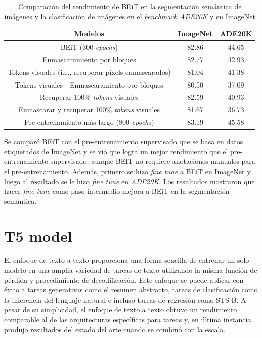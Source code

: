 \begin{table}[h!]
    \centering
    \begin{tabular}{||c c c ||} 
        \hline
        Modelos & ImageNet & ADE20K \\ [0.5ex] 
        \hline\hline
        BEiT (300 \textit{epochs}) & 82.86 & 44.65 \\ 
        \hline
        Enmascaramiento por bloques & 82.77 & 42.93 \\
        \hline
        Tokens visuales (i.e., recuperar píxels enmascarados) & 81.04 & 41.38 \\
        \hline
        Tokens visuales - Enmascaramiento por bloques & 80.50 & 37.09 \\
        \hline
        Recuperar 100\% \textit{tokens} visuales & 82.59 & 40.93 \\
        \hline
        Enmascarar y recuperar 100\% \textit{tokens} visuales & 81.67 & 36.73 \\
        \hline
        Pre-entrenamiento más largo (800 \textit{epochs}) & 83.19 & 45.58 \\ [1ex] 
        \hline
    \end{tabular}
    \caption{Comparación del rendimiento de BEiT en la segmentación semántica de imágenes y la clasificación de imágenes en el \textit{benchmark ADE20K} y en ImageNet}
    \label{table:2}
\end{table}

Se comparó BEiT con el pre-entrenamiento supervisado que se basa en datos etiquetados de ImageNet y se vió que logra un mejor rendimiento que el pre-entrenamiento supervisado, aunque BEIT no requiere anotaciones manuales para el pre-entrenamiento. Además, primero se hizo \textit{fine tune} a BEiT en ImageNet y luego al resultado se le hizo \textit{fine tune} en \textit{ADE20K}. Los resultados mostraron que hacer \textit{fine tune} como paso intermedio mejora a BEiT en la segmentación semántica.

\section{T5 model}
El enfoque de texto a texto proporciona una forma sencilla de entrenar un solo modelo en una amplia variedad de tareas de texto utilizando la misma función de pérdida y procedimiento de decodificación. Este enfoque se puede aplicar con éxito a tareas generativas como el resumen abstracto, tareas de clasificación como la inferencia del lenguaje natural e incluso tareas de regresión como STS-B. A pesar de su simplicidad, el enfoque de texto a texto obtuvo un rendimiento comparable al de las arquitecturas específicas para tareas y, en última instancia, produjo resultados del estado del arte cuando se combinó con la escala.

